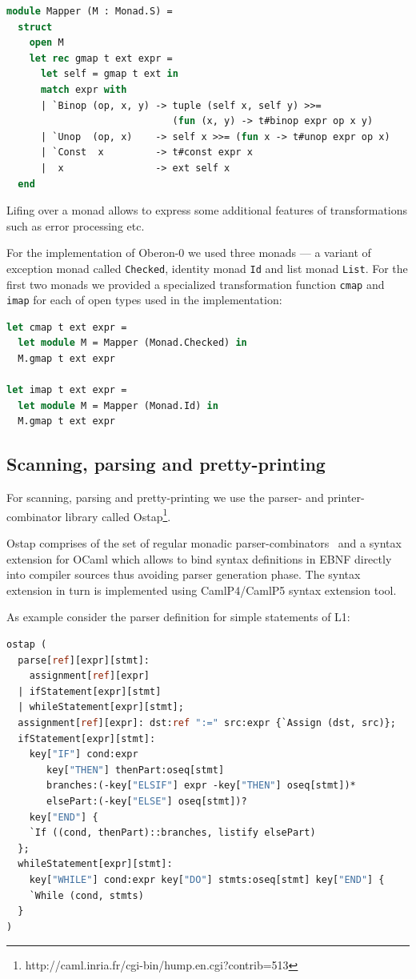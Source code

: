 \begin{lstlisting}[language=ocaml]
module Mapper (M : Monad.S) =
  struct
    open M
    let rec gmap t ext expr = 
      let self = gmap t ext in
      match expr with
      | `Binop (op, x, y) -> tuple (self x, self y) >>= 
                             (fun (x, y) -> t#binop expr op x y)
      | `Unop  (op, x)    -> self x >>= (fun x -> t#unop expr op x)
      | `Const  x         -> t#const expr x
      |  x                -> ext self x 
  end
\end{lstlisting}

Lifing over a monad allows to express some additional features of transformations
such as error processing etc.

For the implementation of Oberon-0 we used three monads --- a variant of exception monad 
called \lstinline{Checked}, identity monad \lstinline{Id} and list monad \lstinline{List}. 
For the first two monads we provided a specialized transformation function \lstinline{cmap}
and \lstinline{imap} for each of open types used in the implementation:

\begin{lstlisting}[language=ocaml]
let cmap t ext expr =
  let module M = Mapper (Monad.Checked) in
  M.gmap t ext expr

let imap t ext expr =
  let module M = Mapper (Monad.Id) in
  M.gmap t ext expr
\end{lstlisting}

\subsection{Scanning, parsing and pretty-printing}

For scanning, parsing and pretty-printing we use the parser- and printer-combinator
library called Ostap\footnote{http://caml.inria.fr/cgi-bin/hump.en.cgi?contrib=513}. 

Ostap comprises of the set of regular monadic parser-combinators~\cite{MonadicParserCombinators} 
and a syntax extension for OCaml which allows to bind syntax definitions in
EBNF directly into compiler sources thus avoiding parser generation phase. The syntax
extension in turn is implemented using CamlP4/CamlP5 syntax extension 
tool. 

As example consider the parser definition for simple statements of L1:

\begin{lstlisting}[language=ocaml]
ostap (
  parse[ref][expr][stmt]: 
    assignment[ref][expr] 
  | ifStatement[expr][stmt] 
  | whileStatement[expr][stmt];
  assignment[ref][expr]: dst:ref ":=" src:expr {`Assign (dst, src)};
  ifStatement[expr][stmt]: 
    key["IF"] cond:expr 
       key["THEN"] thenPart:oseq[stmt]
       branches:(-key["ELSIF"] expr -key["THEN"] oseq[stmt])*
       elsePart:(-key["ELSE"] oseq[stmt])?
    key["END"] {
    `If ((cond, thenPart)::branches, listify elsePart)
  };
  whileStatement[expr][stmt]: 
    key["WHILE"] cond:expr key["DO"] stmts:oseq[stmt] key["END"] {
    `While (cond, stmts)
  }
)
\end{lstlisting}

